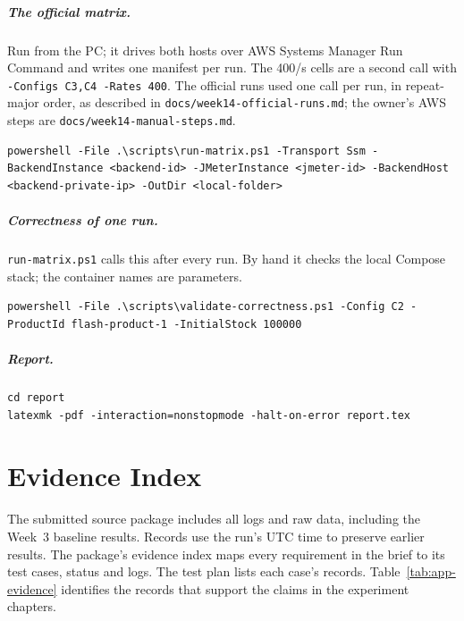 \documentclass[a4paper]{report}
\begin{document}
\paragraph{The official matrix.} Run from the PC; it drives both hosts over
AWS Systems Manager Run Command and writes one manifest per run.
The 400/s cells are a second call with \texttt{-Configs C3,C4 -Rates 400}.
The official runs used one call per run, in repeat-major order, as
described in \nolinkurl{docs/week14-official-runs.md}; the owner's AWS steps are
\nolinkurl{docs/week14-manual-steps.md}.
\begin{Verbatim}[breaklines=true,breakanywhere=true,fontsize=\footnotesize]
powershell -File .\scripts\run-matrix.ps1 -Transport Ssm -BackendInstance <backend-id> -JMeterInstance <jmeter-id> -BackendHost <backend-private-ip> -OutDir <local-folder>
\end{Verbatim}

\paragraph{Correctness of one run.} \texttt{run-matrix.ps1} calls this after
every run. By hand it checks the local Compose stack; the container names
are parameters.
\begin{Verbatim}[breaklines=true,breakanywhere=true,fontsize=\footnotesize]
powershell -File .\scripts\validate-correctness.ps1 -Config C2 -ProductId flash-product-1 -InitialStock 100000
\end{Verbatim}

\paragraph{Report.}
\begin{Verbatim}[breaklines=true,breakanywhere=true,fontsize=\footnotesize]
cd report
latexmk -pdf -interaction=nonstopmode -halt-on-error report.tex
\end{Verbatim}

\chapter{Evidence Index}
\label{app:evidence}

The submitted source package includes all logs and raw data, including the
Week~3 baseline results. Records use the run's UTC time to preserve earlier
results. The package's evidence index maps every
requirement in the brief to its test cases, status and logs. The test plan
lists each case's records. Table~\ref{tab:app-evidence} identifies the records
that support the claims in the experiment chapters.
\end{document}

